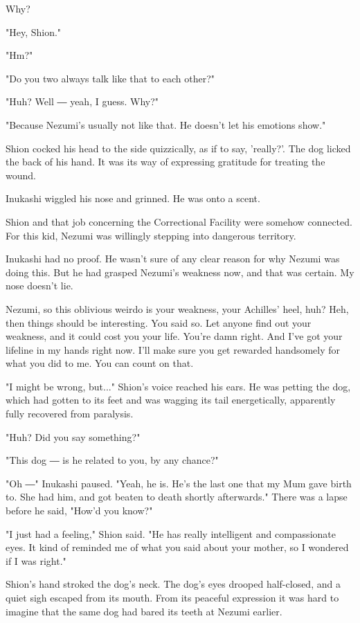 Why?

"Hey, Shion."

"Hm?"

"Do you two always talk like that to each other?"

"Huh? Well ― yeah, I guess. Why?"

"Because Nezumi's usually not like that. He doesn't let his emotions
show."

Shion cocked his head to the side quizzically, as if to say, 'really?'.
The dog licked the back of his hand. It was its way of expressing
gratitude for treating the wound.

Inukashi wiggled his nose and grinned. He was onto a scent.

Shion and that job concerning the Correctional Facility were somehow
connected. For this kid, Nezumi was willingly stepping into dangerous
territory.

Inukashi had no proof. He wasn't sure of any clear reason for why Nezumi
was doing this. But he had grasped Nezumi's weakness now, and that was
certain. My nose doesn't lie.

Nezumi, so this oblivious weirdo is your weakness, your Achilles' heel,
huh? Heh, then things should be interesting. You said so. Let anyone
find out your weakness, and it could cost you your life. You're damn
right. And I've got your lifeline in my hands right now. I'll make sure
you get rewarded handsomely for what you did to me. You can count on
that.

"I might be wrong, but..." Shion's voice reached his ears. He was
petting the dog, which had gotten to its feet and was wagging its tail
energetically, apparently fully recovered from paralysis.

"Huh? Did you say something?"

"This dog ― is he related to you, by any chance?"

"Oh ―" Inukashi paused. "Yeah, he is. He's the last one that my Mum gave
birth to. She had him, and got beaten to death shortly afterwards."
There was a lapse before he said, "How'd you know?"

"I just had a feeling," Shion said. "He has really intelligent and
compassionate eyes. It kind of reminded me of what you said about your
mother, so I wondered if I was right."

Shion's hand stroked the dog's neck. The dog's eyes drooped half-closed,
and a quiet sigh escaped from its mouth. From its peaceful expression it
was hard to imagine that the same dog had bared its teeth at Nezumi
earlier.

